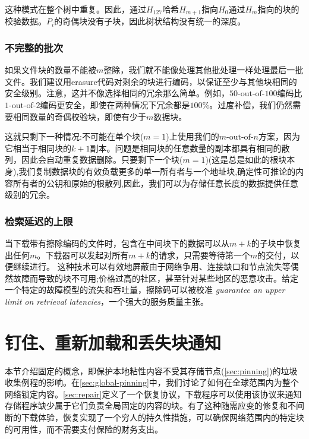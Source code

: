 这种模式在整个树中重复。因此，通过$H_{127}$哈希$H_{m+1}$指向$H_0$通过$H_{m}$指向的块的校验数据。$P_i$的奇偶块没有子块，因此树状结构没有统一的深度。

\subsubsection{不完整的批次}

如果文件块的数量不能被$m$整除，我们就不能像处理其他批处理一样处理最后一批文件。我们建议用erasure代码对剩余的块进行编码，以保证至少与其他块相同的安全级别。注意，这并不像选择相同的冗余那么简单。例如，$50\text{-out-of-}100$编码比$1\text{-out-of-}2$编码更安全，即使在两种情况下冗余都是$100\%$。过度补偿，我们仍然需要相同数量的奇偶校验块，即使有少于$m$数据块。

这就只剩下一种情况:不可能在单个块($m=1$)上使用我们的$m\text{-out-of-}n$方案，因为它相当于相同块的$k+1$副本。问题是相同块的任意数量的副本都具有相同的散列，因此会自动重复数据删除。只要剩下一个块($m=1$)(这是总是如此的根块本身),我们复制数据块的有效负载更多的单一所有者与一个地址块,确定性可推论的内容所有者的公钥和原始的根散列,因此，我们可以为存储任意长度的数据提供任意级别的冗余。

\subsubsection{检索延迟的上限}

当下载带有擦除编码的文件时，包含在中间块下的数据可以从$m+k$的子块中恢复出任何$m$。下载器可以发起对所有$m+k$的请求，只需要等待第一个$m$的交付，以便继续进行。
这种技术可以有效地屏蔽由于网络争用、连接缺口和节点流失等偶然故障而导致的块不可用;价格过高的社区，甚至针对某些地区的恶意攻击。给定一个特定的故障模型的流失和吞吐量，擦除码可以被校准
\emph{guarantee an upper limit on retrieval latencies}，一个强大的服务质量主张。





\section{钉住、重新加载和丢失块通知\statusyellow}\label{sec:reupload}

本节介绍固定的概念，即保护本地粘性内容不受其存储节点(\ref{sec:pinning})的垃圾收集例程的影响。在\ref{sec:global-pinning}中，我们讨论了如何在全球范围内为整个网络锁定内容。\ref{sec:repair}定义了一个恢复协议，下载程序可以使用该协议来通知存储程序缺少属于它们负责全局固定的内容的块。有了这种随需应变的修复和不间断的下载体验，恢复实现了一个穷人的持久性措施，可以确保网络范围内的特定块的可用性，而不需要支付保险的财务支出。

